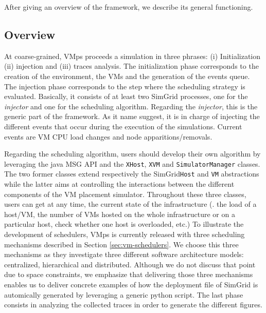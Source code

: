 \documentclass[conference]{IEEEtran}
\newcommand{\sg}{SimGrid\xspace}
\newcommand{\vmps}{VMps\xspace}
\begin{document}
After giving an overview of the framework, we describe  its general
functioning.%

\subsection{Overview}
\label{sec:overview}

At coarse-grained, \vmps proceeds a simulation in three
phrases: (i) Initialization (ii) injection and (iii) traces analysis.
The initialization phase corresponds to the creation of the
environment, the VMs and the generation of the events queue. The
injection phase corresponds to the step where the scheduling strategy
is evaluated. Basically, it consists of at least two \sg processes,
one for the \emph{injector} and one for the scheduling algorithm.
Regarding the \emph{injector}, this is the generic part of the
framework. As it name suggest, it is in charge of injecting the
different events that occur during the execution of the simulations.
Current events are VM CPU load changes and node apparitions/removals.

Regarding the scheduling algorithm, users should develop their own
algorithm by leveraging the java MSG API and the \texttt{XHost},
\texttt{XVM} and \texttt{SimulatorManager} classes. The two former
classes extend respectively the \sg \texttt{Host} and \texttt{VM}
abstractions while the latter aims at controlling the interactions
between the different components of the VM placement simulator.
Throughout these three classes, users can get at any time, the current
state of the infrastructure (\ie. the load of a  host/VM,
the number of VMs hosted on the whole infrastructure or on a particular
host, check whether one host is overloaded, etc.) To illustrate the
development of schedulers, \vmps is currently released with
three scheduling mechanisms described in Section
\ref{sec:vm-schedulers}. We choose this three mechanisms as they
investigate three different software architecture models: centralized,
hierarchical and distributed. Although we do not discuss that point
due to space constraints, we emphasize that delivering those three
mechanisms enables us to deliver concrete examples of
how the deployment file of \sg is automically generated by leveraging a
generic python script.
The last phase consists in analyzing the collected traces in order to
generate the different figures.
\end{document}
